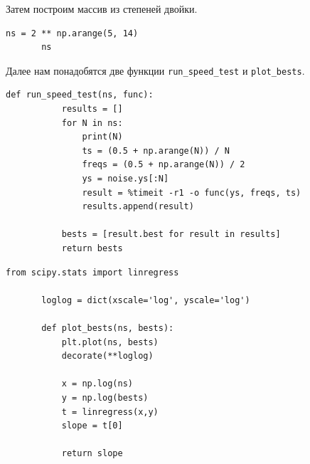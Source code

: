 \documentclass[a4paper,12pt]{report}
\begin{document}
    Затем построим массив из степеней двойки.
\begin{lstlisting}[caption=Создание массива]
       ns = 2 ** np.arange(5, 14)
       ns
\end{lstlisting} 

    Далее нам понадобятся две функции \texttt{run\_speed\_test} и \texttt{plot\_bests}.
\begin{lstlisting}[caption=Функция run\_speed\_test]
       def run_speed_test(ns, func):
           results = []
           for N in ns:
               print(N)
               ts = (0.5 + np.arange(N)) / N
               freqs = (0.5 + np.arange(N)) / 2
               ys = noise.ys[:N]
               result = %timeit -r1 -o func(ys, freqs, ts)
               results.append(result)
        
           bests = [result.best for result in results]
           return bests
\end{lstlisting}
\begin{lstlisting}[caption=Функция plot\_bests]
       from scipy.stats import linregress

       loglog = dict(xscale='log', yscale='log')

       def plot_bests(ns, bests):    
           plt.plot(ns, bests)
           decorate(**loglog)
    
           x = np.log(ns)
           y = np.log(bests)
           t = linregress(x,y)
           slope = t[0]

           return slope
\end{lstlisting}    
\end{document}
